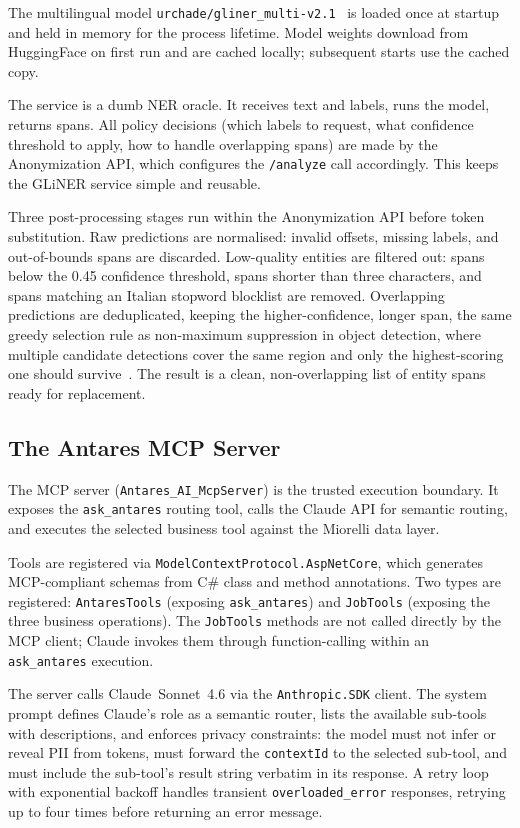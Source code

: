 The multilingual model \texttt{urchade/gliner\_multi-v2.1}~\cite{zaratiana2023gliner} is loaded once at startup and held in memory for the process lifetime. Model weights download from HuggingFace on first run and are cached locally; subsequent starts use the cached copy.

The service is a dumb NER oracle. It receives text and labels, runs the model, returns spans. All policy decisions (which labels to request, what confidence threshold to apply, how to handle overlapping spans) are made by the Anonymization API, which configures the \texttt{/analyze} call accordingly. This keeps the GLiNER service simple and reusable.

Three post-processing stages run within the Anonymization API before token substitution. Raw predictions are normalised: invalid offsets, missing labels, and out-of-bounds spans are discarded. Low-quality entities are filtered out: spans below the 0.45 confidence threshold, spans shorter than three characters, and spans matching an Italian stopword blocklist are removed. Overlapping predictions are deduplicated, keeping the higher-confidence, longer span, the same greedy selection rule as non-maximum suppression in object detection, where multiple candidate detections cover the same region and only the highest-scoring one should survive~\cite{neubeck2006nms}. The result is a clean, non-overlapping list of entity spans ready for replacement.

\subsection{The Antares MCP Server}
\label{subsec:arch_antares_mcp_server}

The MCP server (\texttt{Antares\_AI\_McpServer}) is the trusted execution boundary. It exposes the \texttt{ask\_antares} routing tool, calls the Claude API for semantic routing, and executes the selected business tool against the Miorelli data layer.

Tools are registered via \texttt{ModelContextProtocol.AspNetCore}, which generates MCP-compliant schemas from C\# class and method annotations. Two types are registered: \texttt{AntaresTools} (exposing \texttt{ask\_antares}) and \texttt{JobTools} (exposing the three business operations). The \texttt{JobTools} methods are not called directly by the MCP client; Claude invokes them through function-calling within an \texttt{ask\_antares} execution.

The server calls Claude~Sonnet~4.6 via the \texttt{Anthropic.SDK} client. The system prompt defines Claude's role as a semantic router, lists the available sub-tools with descriptions, and enforces privacy constraints: the model must not infer or reveal PII from tokens, must forward the \texttt{contextId} to the selected sub-tool, and must include the sub-tool's result string verbatim in its response. A retry loop with exponential backoff handles transient \texttt{overloaded\_error} responses, retrying up to four times before returning an error message.

